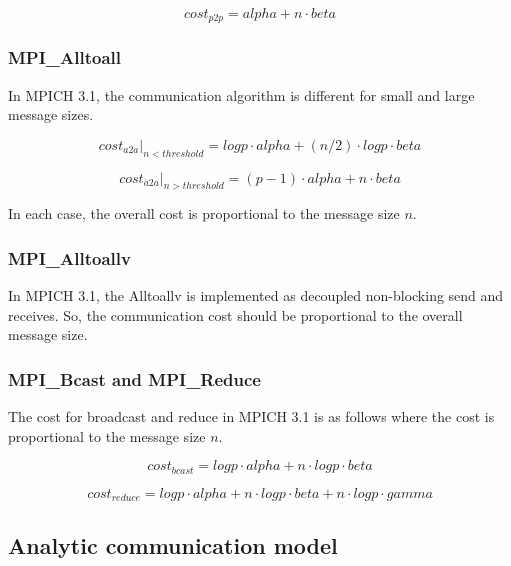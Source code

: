 \begin{equation}
cost_{p2p} = alpha + n\cdot beta
\end{equation}


\subsubsection{MPI\_Alltoall}

In MPICH 3.1, the communication algorithm is different for small and
large message sizes.

\begin{equation}
cost_{a2a}|_{n<threshold} = log p\cdot alpha + (n/2)\cdot log p\cdot beta
\end{equation}

\begin{equation}
cost_{a2a}|_{n>threshold} = (p-1)\cdot alpha + n\cdot beta
\end{equation}

In each case, the overall cost is proportional to the message size
$n$.


\subsubsection{MPI\_Alltoallv}

In MPICH 3.1, the Alltoallv is implemented as decoupled non-blocking
send and receives.  So, the communication cost should be proportional
to the overall message size.


\subsubsection{MPI\_Bcast and MPI\_Reduce}

The cost for broadcast and reduce in MPICH 3.1 is as follows where the
cost is proportional to the message size $n$.

\begin{equation}
cost_{bcast} = log p\cdot alpha + n\cdot log p\cdot beta
\end{equation}

\begin{equation}
cost_{reduce} = log p\cdot alpha + n\cdot log p\cdot beta + n\cdot log p\cdot gamma
\end{equation}


\subsection{Analytic communication model}

